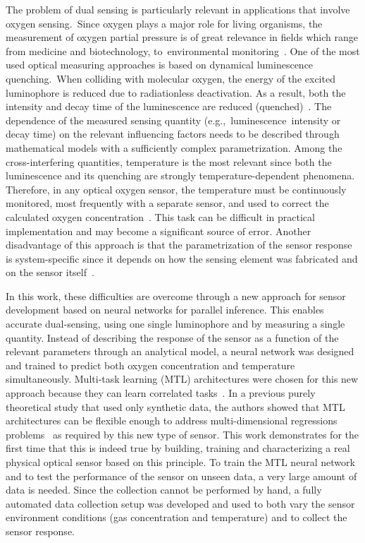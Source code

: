 \documentclass[sensors,article,accept,moreauthors,pdftex,10pt,a4paper]{Definitions/mdpi}
\begin{document}
The problem of dual sensing is particularly relevant in applications that involve oxygen sensing.~Since oxygen plays a major role for living organisms, the measurement of oxygen partial pressure is of great relevance in fields which range from medicine and  biotechnology, to~environmental monitoring~\cite{Papkovsky2013,Wang2014}. One of the most used optical measuring approaches is based on dynamical luminescence quenching.~When colliding with molecular oxygen, the energy of the excited luminophore is reduced due to radiationless deactivation. As a result, both the intensity and decay time of the luminescence are reduced (quenched)~\cite{Lakowicz2006}. The dependence of the measured sensing quantity (e.g.,~luminescence~intensity or decay time) on the relevant influencing factors needs to be described through mathematical models with a sufficiently complex parametrization. Among the cross-interfering quantities, temperature is the most relevant since both the luminescence and its quenching are strongly temperature-dependent phenomena. Therefore, in any optical oxygen sensor, the temperature must be continuously monitored, most frequently with a separate sensor, and used to correct the calculated oxygen concentration~\cite{Li2015}. This task can be difficult in practical implementation and may become a significant source of error. Another disadvantage of this approach is that the parametrization of the sensor response is system-specific since it depends on how the sensing element was fabricated and on the sensor itself~\cite{Xu1994,Draxler1995,Hartmann1996,Mills1998,Badocco2008,Dini2011}.

In this work, these difficulties are overcome through a new approach for sensor development based on neural networks for parallel inference. This enables  accurate dual-sensing, using one single luminophore and by measuring a single quantity.
Instead of describing the response of the sensor as a function of the relevant parameters through an analytical model, a neural network was designed and trained to predict both oxygen concentration and temperature simultaneously.
Multi-task learning (MTL) architectures were chosen for this new approach because they can learn correlated tasks~\cite{Argyriou2006, Thrun1996, Caruana1997, Zhang2017, Baxter2000, Thung2018}. In a previous purely theoretical study that used only synthetic data, the authors showed that MTL architectures can be flexible enough to address multi-dimensional regressions problems~\cite{Michelucci2019_2} as required by this new type of sensor. This work demonstrates for the first time that this is indeed true by building, training and characterizing a real physical optical sensor based on this principle.
To train the MTL neural network and to test the performance of the sensor on unseen data, a very large amount of data is needed. Since the collection  cannot be performed by hand, a fully automated data collection setup was developed and used to both vary the sensor environment conditions (gas concentration and temperature) and to collect the sensor response. 
\end{document}
